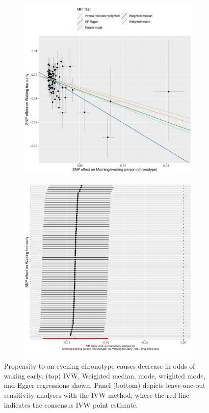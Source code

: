\documentclass{article}
\begin{document}
% 
\begin{figure}[htbp]
\begin{subfigure}{\linewidth}
\centering
	\includegraphics[width=.8\linewidth]{Figs/Analysis2/Morning_evening_person_(chronotype)_vs_Waking_too_early.Scatterplots.pdf}
\label{wakeScatter}
\end{subfigure}
\begin{subfigure}{\linewidth}
\centering
	\includegraphics[width=.8\linewidth,keepaspectratio]{Figs/Analysis2/Morning_evening_person_(chronotype)_vs_Waking_too_early.LOOplots.pdf}
\label{wakeLoo}
\end{subfigure}
\caption{Propensity to an evening chronotype causes decrease in odds of waking early. (top) IVW, Weighted median, mode, weighted mode, and Egger regressions shown. Panel (bottom) depicts leave-one-out sensitivity analyses with the IVW method, where the red line indicates the consensus IVW point estimate.}
\label{wake}
\end{figure}
\end{document}
